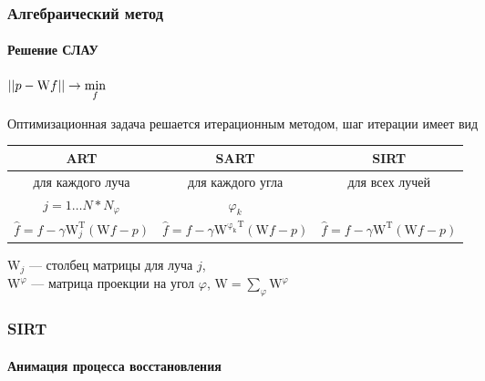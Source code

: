 \begin{frame}
\frametitle{Алгебраический метод}
\framesubtitle{Решение СЛАУ}
\centering
$\left|\left| p - \mathrm W f \right|\right| \rightarrow \min\limits_f$

Оптимизационная задача решается итерационным методом, шаг итерации имеет вид
\vspace{0.5cm}

\begingroup
\footnotesize

\hspace*{-0.5cm}
\begin{tabular}{c|c|c}
ART & SART & SIRT \\ \hline
для каждого луча & для каждого угла & для всех лучей\\
$j = 1 \dots N * N_\varphi$ & $\varphi_k$ & \\
$\hat{f} = f - \gamma \mathrm W^{\mathrm T}_j(\mathrm W f - p)$ &
$\hat{f} = f - \gamma \mathrm {W^{\varphi_k}}^{\mathrm T}(\mathrm W f - p)$ &
$\hat{f} = f - \gamma \mathrm W^{\mathrm T}(\mathrm W f - p)$ \\
\end{tabular}

\vspace{0.5cm}
\raggedright
\endgroup

$\mathrm W_j$ --- столбец матрицы для луча $j$,\\
$\mathrm W^\varphi$ ---  матрица проекции на угол $\varphi$, $\mathrm W = \sum_\varphi {\mathrm W^\varphi}$


\end{frame}

\begin{frame}
\frametitle{SIRT}
\framesubtitle{Анимация процесса восстановления}
\begin{columns}[T,onlytextwidth]
\begin{column}{0.4\textwidth}
\end{column}

\begin{column}{0.6\textwidth}
\end{column}
\end{columns}
\end{frame}


